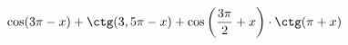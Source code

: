 \begin{ex}[type=expression]
	\begin{condition}
		\( \cos(3\pi-x)+\ctg(3,5\pi-x)+\cos\left( \dfrac{3\pi}{2}+x \right)\cdot\ctg(\pi+x) \)
	\end{condition}
\end{ex}
